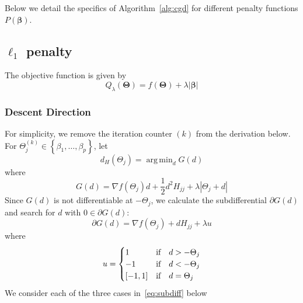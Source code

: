 \documentclass[12pt,letter]{article}\usepackage[]{graphicx}\usepackage[]{color}
\newcommand{\tm}[1]{\textrm{{#1}}}
\newcommand{\bTheta}{\boldsymbol{\Theta}}
\newcommand{\bbeta}{\boldsymbol{\beta}}
\DeclareMathOperator*{\argmin}{arg\,min}
\begin{document}
Below we detail the specifics of Algorithm~\ref{alg:cgd} for different penalty functions $P(\bbeta)$.
\subsection{$\ell_1$ penalty}\label{subsec:l1penalty}
The objective function is given by
\begin{equation}
	Q_{\lambda}(\bTheta) = f(\bTheta) + \lambda |\bbeta|
\end{equation}


\subsubsection{Descent Direction}
For simplicity, we remove the iteration counter $(k)$ from the derivation below.\\ For \mbox{$\Theta_j^{(k)} \in \left\lbrace \beta_1, \ldots, \beta_p \right\rbrace$}, let
\begin{equation}
	d_{H}(\Theta_{j}) = \argmin_{d} G(d)  \label{eq:argminGd}
\end{equation}
where
\[ G(d) =  \nabla f(\Theta_{j}) d + \frac{1}{2} d^2 H_{j j} + \lambda |\Theta_{j} + d| \]
Since $G(d)$ is not differentiable at $-\Theta_j$, we calculate the subdifferential $\partial G(d)$ and search for $d$ with $0 \in \partial G(d)$:
\begin{equation}
	\partial G(d) = \nabla f(\Theta_{j}) + d H_{j j} + \lambda u   \label{eq:subdiff}
\end{equation}
where
\begin{equation}
	u = \begin{cases}
		1 & \tm{if\quad}d > -\Theta_j \\
		-1 & \tm{if\quad} d < -\Theta_j\\
		[-1,1] & \tm{if\quad} d = \Theta_j
	\end{cases}
\end{equation}
We consider each of the three cases in~\eqref{eq:subdiff} below
\end{document}
